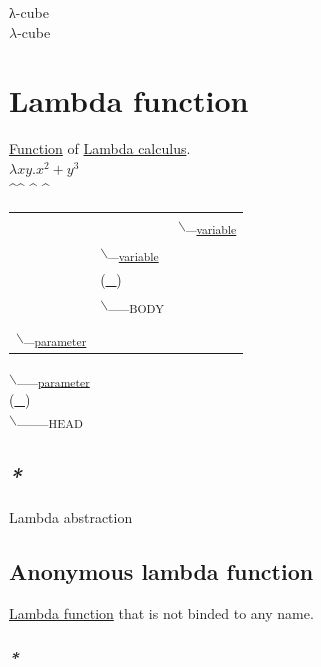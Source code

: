 \documentclass[a4paper,14pt,oneside]{book}
\begin{document}
\label{org9391efe}λ-cube\\
\label{org3555c12}\(\lambda\)-cube\\

\section{\label{orgdbc7789}Lambda function}
\label{sec:org8072f9e}
\hyperref[org3864397]{Function} of \hyperref[orga8f06c0]{Lambda calculus}.\\
\(\lambda x y.x^2 + y^3\)\\
 \^{}\^{} \^{}    \^{}\\
\begin{center}
\begin{tabular}{lll}
 &  & $\backslash$_\textsubscript{\hyperref[orga908603]{variable}}\\
 & $\backslash$_\textsubscript{\hyperref[orga908603]{variable}}\\
 & (\uline{\uline{\_}})\\
 & $\backslash$_\_\textsubscript{BODY}\\
\\
$\backslash$_\textsubscript{\hyperref[orgbece9ff]{parameter}}\\
\end{tabular}
\end{center}
  $\backslash$_\_\textsubscript{\hyperref[orgbece9ff]{parameter}}\\
(\uline{\_})\\
   $\backslash$_\_\_\textsubscript{HEAD}\\

\subsection{\emph{*}}
\label{sec:orgfd2902e}

\label{org254e6f1}Lambda abstraction\\

\subsection{\label{orgcf7f8ae}Anonymous lambda function}
\label{sec:org47023fe}
\hyperref[orgdbc7789]{Lambda function} that is not binded to any name.\\

\subsubsection{\emph{*}}
\label{sec:org45301ff}
\end{document}
